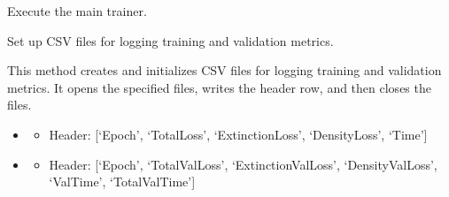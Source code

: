 \documentclass[letterpaper,10pt,english]{sphinxmanual}
\begin{document}
\begin{fulllineitems}
\begin{fulllineitems}
\begin{description}
\end{description}

\end{fulllineitems}


\begin{fulllineitems}
\label{\detokenize{MainTrainer:MainTrainer.MainTrainer.run}}
\pysigstartsignatures
{}
\pysigstopsignatures
\sphinxAtStartPar
Execute the main trainer.

\end{fulllineitems}


\begin{fulllineitems}
\label{\detokenize{MainTrainer:MainTrainer.MainTrainer.setup_csv_files}}
\pysigstartsignatures
{}
\pysigstopsignatures
\sphinxAtStartPar
Set up CSV files for logging training and validation metrics.
\begin{description}
\sphinxAtStartPar
This method creates and initializes CSV files for logging training and validation metrics. 
It opens the specified files, writes the header row, and then closes the files.

\begin{itemize}
\item {} \begin{description}
\begin{itemize}
\item {} 
\sphinxAtStartPar
Header: {[}‘Epoch’, ‘TotalLoss’, ‘ExtinctionLoss’, ‘DensityLoss’, ‘Time’{]}

\end{itemize}

\end{description}

\item {} \begin{description}
\begin{itemize}
\item {} 
\sphinxAtStartPar
Header: {[}‘Epoch’, ‘TotalValLoss’, ‘ExtinctionValLoss’, ‘DensityValLoss’, ‘ValTime’, ‘TotalValTime’{]}


\end{itemize}
\end{description}
\end{itemize}
\end{description}
\end{fulllineitems}
\end{fulllineitems}
\end{document}
